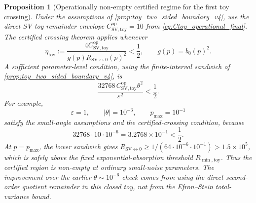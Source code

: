 \documentclass[11pt]{article}
\newtheorem{proposition}{Proposition}
\newcommand{\1}{\mathbf{1}}
\begin{document}
\begin{proposition}[Operationally non-empty certified regime for the first toy crossing]
\label{prop:toy_certified_nonempty_v5}
Under the assumptions of \cref{prop:toy_two_sided_boundary_v4}, use the direct SV toy remainder envelope \(C_{\mathrm{SV},\mathrm{toy}}^{\mathrm{op}}=10\) from \cref{eq:Ctoy_operational_final}.  The certified crossing theorem applies whenever
\begin{equation}
    \eta_{\mathrm{toy}}
    :=\frac{4C_{\mathrm{SV},\mathrm{toy}}^{\mathrm{op}}}{g(p)R_{\mathrm{SV}\leftrightarrow0}(p)^2}<\frac12,
    \qquad
    g(p)=b_0(p)^2.
    \label{eq:toy_eta_verified_condition_v5}
\end{equation}
A sufficient parameter-level condition, using the finite-interval sandwich of \cref{prop:toy_two_sided_boundary_v4}, is
\begin{equation}
    \frac{32768\,C_{\mathrm{SV},\mathrm{toy}}^{\mathrm{op}}\theta^2}{\varepsilon^2}<\frac12.
    \label{eq:toy_explicit_nonempty_condition_v5}
\end{equation}
For example,
\begin{equation}
    \varepsilon=1,
    \qquad
    |\theta|=10^{-3},
    \qquad
    p_{\max}=10^{-1}
\end{equation}
satisfy the small-angle assumptions and the certified-crossing condition, because
\begin{equation}
    32768\cdot 10\cdot10^{-6}=3.2768\times10^{-1}<\frac12.
\end{equation}
At \(p=p_{\max}\), the lower sandwich gives \(R_{\mathrm{SV}\leftrightarrow0}\ge1/(64\cdot10^{-6}\cdot10^{-1})>1.5\times10^5\), which is safely above the fixed exponential-absorption threshold \(R_{\min,\mathrm{toy}}\).  Thus the certified region is non-empty at ordinary small-noise parameters.  The improvement over the earlier \(\theta\sim10^{-6}\) check comes from using the direct second-order quotient remainder in this closed toy, not from the Efron--Stein total-variance bound.
\end{proposition}
\end{document}
